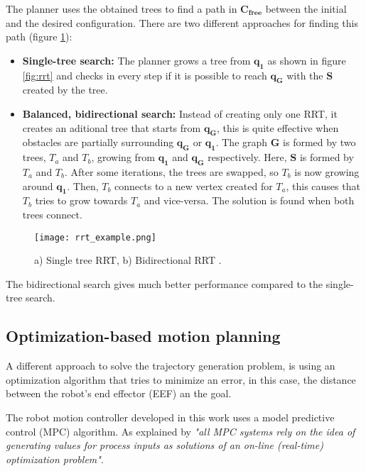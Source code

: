 The planner uses the obtained trees to find a path in $\bm{C_{free}}$ between the initial and the desired configuration. There are two different approaches for finding this path (figure \ref{fig:rrt_ex}):
\begin{itemize}
	\item \textbf{Single-tree search:} The planner grows a tree from $\bm{q_1}$ as shown in figure \ref{fig:rrt} and checks in every step if it is possible to reach $\bm{q_G}$ with the $\bm{S}$ created by the tree.
	\item \textbf{Balanced, bidirectional search:} Instead of creating only one RRT, it creates an aditional tree that starts from $\bm{q_G}$, this is quite effective when obstacles are partially surrounding $\bm{q_G}$ or $\bm{q_1}$. The graph $\bm{G}$ is formed by two trees, $T_a$ and $T_b$, growing from $\bm{q_1}$ and $\bm{q_G}$ respectively. Here, $\bm{S}$ is formed by $T_a$ and $T_b$. After some iterations, the trees are swapped, so $T_b$ is now growing around $\bm{q_1}$. Then, $T_b$ connects to a new vertex created for $T_a$, this causes that $T_b$ tries to grow towards $T_a$ and vice-versa. The solution is found when both trees connect.
\end{itemize}

\begin{figure}[H]
	\centering
	\texttt{[image: rrt\_example.png]}
	\vspace{-10pt}
	\caption[Single and bidirectional RTT]{ a) Single tree RRT, b) Bidirectional RRT \citep[chap.5, page 219]{planning}.}
	\vspace{-15pt}
	\label{fig:rrt_ex}
\end{figure}

The bidirectional search gives much better performance compared to the single-tree search.

\subsection{Optimization-based motion planning}
\label{sub:optimization}
A different approach to solve the trajectory generation problem, is using an optimization algorithm that tries to minimize an error, in this case, the distance between the robot's end effector (EEF) an the goal.
 
The robot motion controller developed in this work uses a model predictive control (MPC) algorithm. As explained by \citet{mpc} \textit{"all MPC systems rely on the idea of generating values for process inputs as solutions of an on-line (real-time) optimization problem"}. 

